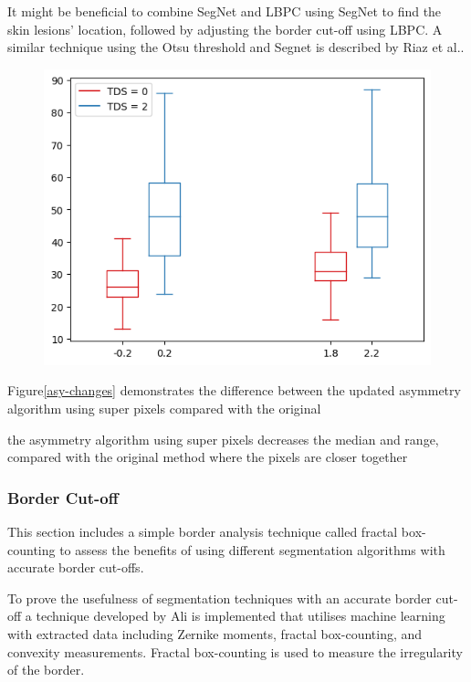 It might be beneficial to combine SegNet and LBPC using SegNet to find the skin lesions' location, followed by adjusting the border cut-off using LBPC. A similar technique using the Otsu threshold and Segnet is described by Riaz et al.\cite{Riaz2019}.

\begin{figure}
    \centering
    \includegraphics[scale=1.2]{images/asymmetry/asy-changes.png}
    \caption{} 
\end{figure}\label{asy-changes}

Figure\ref{asy-changes} demonstrates the difference between the updated asymmetry algorithm using super pixels compared with the original


the asymmetry algorithm using super pixels decreases the median and range, compared with the original method where the pixels are closer together


\subsubsection{Border Cut-off}
This section includes a simple border analysis technique called fractal box-counting to assess the benefits of using different segmentation algorithms with accurate border cut-offs.

To prove the usefulness of segmentation techniques with an accurate border cut-off a technique developed by Ali\cite{Ali2020b} is implemented that utilises machine learning with extracted data including Zernike moments, fractal box-counting, and convexity measurements. Fractal box-counting is used to measure the irregularity of the border.


